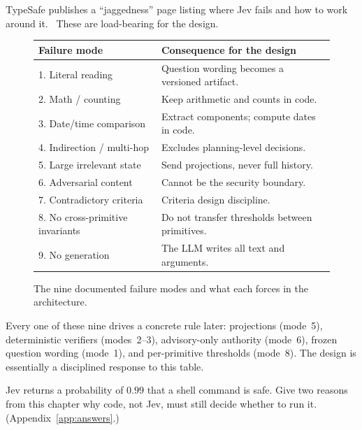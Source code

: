 TypeSafe publishes a ``jaggedness'' page listing where Jev fails and how to work around
it.\DOC{}~\citep{typesafe_jaggedness} These are load-bearing for the design.

\begin{figure}[h]\centering
\small
\begin{tabular}{@{}p{4.6cm}p{7.4cm}@{}}
\toprule
Failure mode & Consequence for the design \\
\midrule
1. Literal reading & Question wording becomes a versioned artifact. \\
2. Math / counting & Keep arithmetic and counts in code. \\
3. Date/time comparison & Extract components; compute dates in code. \\
4. Indirection / multi-hop & Excludes planning-level decisions. \\
5. Large irrelevant state & Send projections, never full history. \\
6. Adversarial content & Cannot be the security boundary. \\
7. Contradictory criteria & Criteria design discipline. \\
8. No cross-primitive invariants & Do not transfer thresholds between primitives. \\
9. No generation & The LLM writes all text and arguments. \\
\bottomrule
\end{tabular}
\caption{The nine documented failure modes and what each forces in the architecture.~\citep{typesafe_jaggedness}}
\label{fig:failuremodes}
\end{figure}

\begin{whyhere}
Every one of these nine drives a concrete rule later: projections (mode~5), deterministic
verifiers (modes~2--3), advisory-only authority (mode~6), frozen question wording
(mode~1), and per-primitive thresholds (mode~8). The design is essentially a disciplined
response to this table.
\end{whyhere}

\begin{checkbox}
Jev returns a probability of \(0.99\) that a shell command is safe. Give two reasons from
this chapter why code, not Jev, must still decide whether to run it. (Appendix~\ref{app:answers}.)
\end{checkbox}
